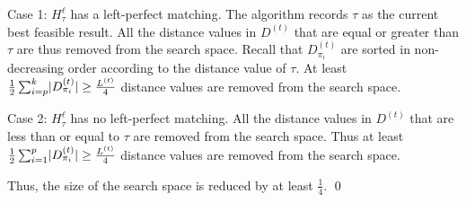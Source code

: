 \documentclass{article}
\begin{document}
Case 1: $H^{\ell}_{\tau}$ has a left-perfect matching.
The algorithm records $\tau$ as the current best feasible result. 
All the distance values in $D^{(t)}$ that are equal or greater than $\tau$ are thus removed from the search space. 
Recall that $D_{\pi_i}^{(t)}$ are sorted in non-decreasing order according to the distance value of $\tau$. 
At least $\frac{1}{2} \sum_{i=p}^{k} \lvert D_{\pi_{i}}^{(t)} \rvert  \geq \frac{L^{(t)}}{4}$ distance values are removed from the search space.


Case 2: $H^{\ell}_{\tau}$ has no left-perfect matching. 
All the distance values in $D^{(t)}$ that are less than or equal to $\tau$ are removed from the search space.
Thus at least $\frac{1}{2} \sum_{i=1}^{p} \lvert D_{\pi_{i}}^{(t)} \rvert  \geq \frac{L^{(t)}}{4}$ distance values are removed from the search space.

Thus, the size of the search space is reduced by at least $\frac{1}{4}$.
\hfill\qed



    
















        

\end{document}
